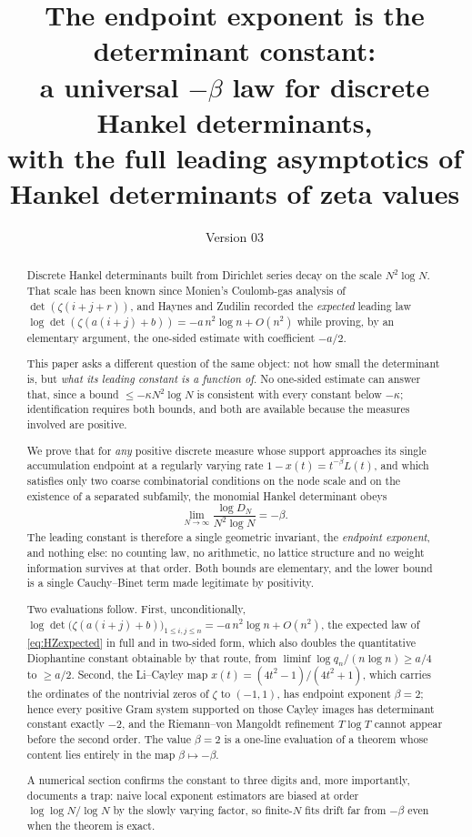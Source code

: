 \documentclass[11pt]{amsart}
\title[The endpoint exponent law]{The endpoint exponent is the determinant constant:\\
a universal $-\beta$ law for discrete Hankel determinants,\\
with the full leading asymptotics of Hankel determinants of zeta values}
\author{}
\date{Version 03}
\numberwithin{equation}{section}
\theoremstyle{plain}
\theoremstyle{definition}
\theoremstyle{remark}
\begin{document}
\begin{abstract}
Discrete Hankel determinants built from Dirichlet series decay on the scale $N^{2}\log N$.
That scale has been known since Monien's Coulomb-gas analysis of $\det(\zeta(i+j+r))$, and
Haynes and Zudilin recorded the \emph{expected} leading law
$\log\det(\zeta(a(i+j)+b))=-a\,n^{2}\log n+O(n^{2})$ while proving, by an elementary argument, the
one-sided estimate with coefficient $-a/2$.

This paper asks a different question of the same object: not how small the determinant is, but
\emph{what its leading constant is a function of}. No one-sided estimate can answer that, since a
bound $\le-\kappa N^{2}\log N$ is consistent with every constant below $-\kappa$; identification
requires both bounds, and both are available because the measures involved are positive.

We prove that for \emph{any} positive discrete measure whose support approaches its single
accumulation endpoint at a regularly varying rate
$1-x(t)=t^{-\beta}L(t)$, and which satisfies only two coarse combinatorial conditions on the
node scale and on the existence of a separated subfamily, the monomial Hankel determinant obeys
\[
\lim_{N\to\infty}\frac{\log D_{N}}{N^{2}\log N}=-\beta .
\]
The leading constant is therefore a single geometric invariant, the \emph{endpoint exponent},
and nothing else: no counting law, no arithmetic, no lattice structure and no weight
information survives at that order. Both bounds are elementary, and the lower bound is a single
Cauchy--Binet term made legitimate by positivity.

Two evaluations follow. First, unconditionally,
$\log\det\bigl(\zeta(a(i+j)+b)\bigr)_{1\le i,j\le n}=-a\,n^{2}\log n+O(n^{2})$, the expected law of
\eqref{eq:HZexpected} in full and in two-sided form, which also doubles the quantitative Diophantine
constant obtainable by that route, from $\liminf\log q_{n}/(n\log n)\ge a/4$ to $\ge a/2$.
Second, the Li--Cayley
map $x(t)=(4t^{2}-1)/(4t^{2}+1)$, which carries the ordinates of the nontrivial zeros of $\zeta$
to $(-1,1)$, has endpoint exponent $\beta=2$; hence every positive Gram system supported on those
Cayley images has determinant constant exactly $-2$, and the Riemann--von Mangoldt refinement
$T\log T$ cannot appear before the second order. The value $\beta=2$ is a one-line evaluation of a
theorem whose content lies entirely in the map $\beta\mapsto-\beta$.

A numerical section confirms the constant to three digits and, more importantly, documents a
trap: naive local exponent estimators are biased at order $\log\log N/\log N$ by the slowly
varying factor, so finite-$N$ fits drift far from $-\beta$ even when the theorem is exact.
\end{abstract}
\end{document}
